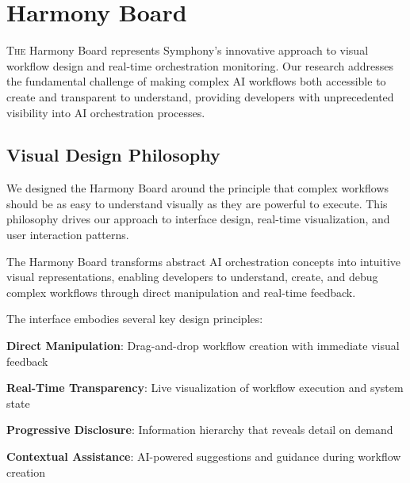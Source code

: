 
\section*{Harmony Board}

\lettrine{T}{he} Harmony Board represents Symphony's innovative approach to visual workflow design and real-time orchestration monitoring. Our research addresses the fundamental challenge of making complex AI workflows both accessible to create and transparent to understand, providing developers with unprecedented visibility into AI orchestration processes.

\subsection*{Visual Design Philosophy}

We designed the Harmony Board around the principle that complex workflows should be as easy to understand visually as they are powerful to execute. This philosophy drives our approach to interface design, real-time visualization, and user interaction patterns.

\begin{infobox}[title=Visual Workflow Design Principles]
The Harmony Board transforms abstract AI orchestration concepts into intuitive visual representations, enabling developers to understand, create, and debug complex workflows through direct manipulation and real-time feedback.
\end{infobox}

The interface embodies several key design principles:

\begin{compactlist}
    \item \textbf{Direct Manipulation}: Drag-and-drop workflow creation with immediate visual feedback
    \item \textbf{Real-Time Transparency}: Live visualization of workflow execution and system state
    \item \textbf{Progressive Disclosure}: Information hierarchy that reveals detail on demand
    \item \textbf{Contextual Assistance}: AI-powered suggestions and guidance during workflow creation
\end{compactlist}

